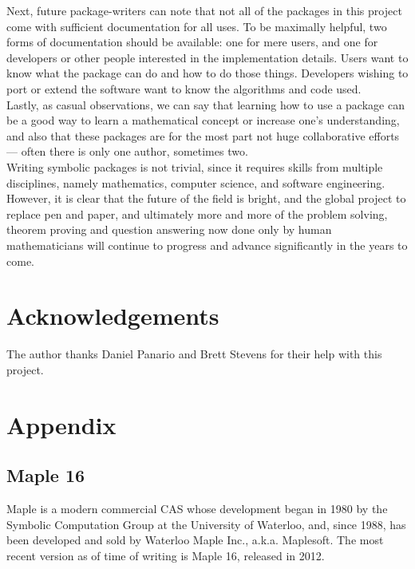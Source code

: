 \documentclass[12pt]{article}
\theoremstyle{plain}
\begin{document}
Next, future package-writers can note that not all of the packages in this project come with sufficient documentation for all uses.
To be maximally helpful, two forms of documentation should be available: one for mere users, and one for developers or other people interested in the implementation details.
Users want to know what the package can do and how to do those things.
Developers wishing to port or extend the software want to know the algorithms and code used.\\

Lastly, as casual observations, we can say that learning how to use a package can be a good way to learn a mathematical concept or increase one's understanding, and also that
these packages are for the most part not huge collaborative efforts ---
often there is only one author, sometimes two.\\


Writing symbolic packages is not trivial, since it requires skills from multiple disciplines, namely mathematics, computer science, and software engineering.
However, it is clear that the future of the field is bright, and
the global project to replace pen and paper, and ultimately more and more of the problem solving, theorem proving and question answering now done only by human mathematicians will continue to progress and advance significantly in the years to come.

\section*{Acknowledgements}
The author thanks Daniel Panario and Brett Stevens for their help with
this project.







\section*{Appendix}

\subsection*{Maple 16}
Maple is a modern commercial CAS whose development began in 1980 by the Symbolic Computation Group at the University of Waterloo, and, since 1988, has been developed and sold by Waterloo Maple Inc., a.k.a. Maplesoft.
The most recent version as of time of writing is Maple 16, released in 2012.
\end{document}
